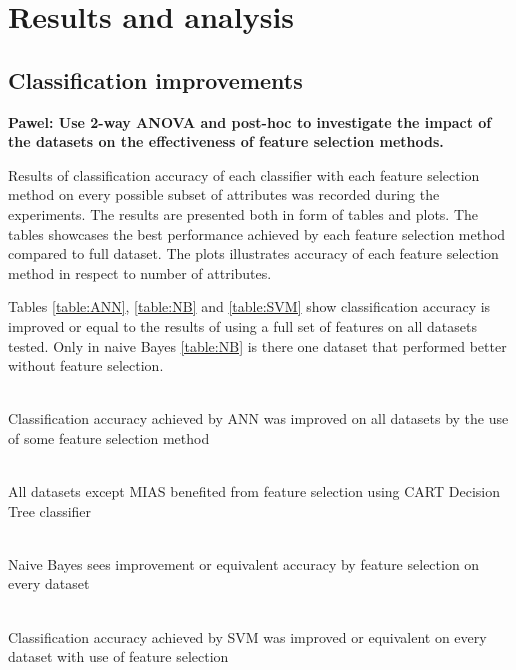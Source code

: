 \chapter{Results and analysis}

\section{Classification improvements}

\textbf{ Pawel: Use 2-way ANOVA and post-hoc to investigate the impact of the datasets on the effectiveness of feature selection methods. }

Results of classification accuracy of each classifier with each feature selection method on every possible subset of attributes was recorded during the experiments. The results are presented both in form of tables and plots. The tables showcases the best performance achieved by each feature selection method compared to full dataset. The plots illustrates accuracy of each feature selection method in respect to number of attributes.

Tables \ref{table:ANN}, \ref{table:NB} and \ref{table:SVM} show classification accuracy is improved or equal to the results of using a full set of features on all datasets tested. Only in naive Bayes \ref{table:NB} is there one dataset that performed better without feature selection.

\begin{table}
   \\
  \caption{Classification accuracy achieved by ANN was improved on all datasets by the use of some feature selection method}
  \label{table:ANN}
  \vspace{1em}

   \\
  \caption{All datasets except MIAS benefited from feature selection using CART Decision Tree classifier}
  \label{table:CART}
  \vspace{1em}

   \\
  \caption{Naive Bayes sees improvement or equivalent accuracy by feature selection on every dataset}
  \label{table:NB}
  \vspace{1em}

   \\
  \caption{Classification accuracy achieved by SVM was improved or equivalent on every dataset with use of feature selection}
  \label{table:SVM}
\end{table}

